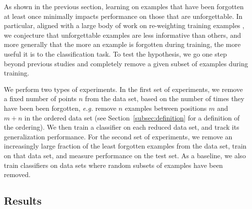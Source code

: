 
As shown in the previous section, learning on examples that have been forgotten at least once  minimally impacts performance on those that are unforgettable.
In particular,  aligned with a large body of work on re-weighting training examples \citep{Bengio+chapter2007,Kumar10,Fan2017,screenerNet,Zhao2015,conf/icml/KatharopoulosF18}, we conjecture that unforgettable examples are less informative than others, and more generally that the more an example is forgotten during training, the more useful it is to the classification task. 
To test the hypothesis, we go one step beyond previous studies and completely remove a given subset of examples during training. 

We perform two types of experiments.  In the first set of experiments, we remove a fixed number of points $n$ from the data set, based on the number of times they have been been forgotten, \textit{e.g.} remove $n$ examples between positions $m$ and $m+n$ in the ordered data set (see Section~\ref{subsec:definition} for a definition of the ordering). We then train a classifier on each reduced data set, and track its generalization performance. For the second set of experiments, we remove an increasingly large fraction of the least forgotten examples from the data set, train on that data set, and measure performance on the test set. As a baseline, we also train classifiers on data sets where random subsets of examples have been removed.

\subsection{Results}

